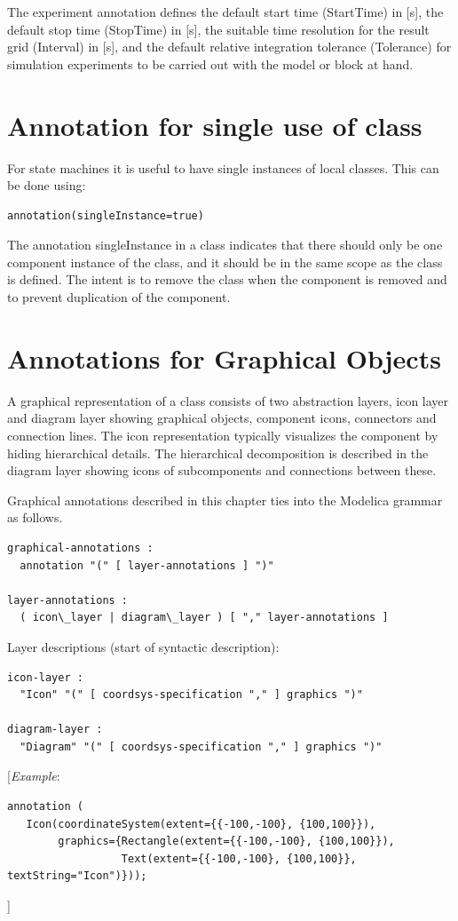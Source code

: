 \documentclass[10pt,a4paper]{report}
\def\doublelabel#1{\label{#1}}
\begin{document}
The experiment annotation defines the default start time (StartTime) in
  {[}s{]}, the default stop time (StopTime) in {[}s{]}, the suitable time
  resolution for the result grid (Interval) in {[}s{]}, and the default
relative integration tolerance (Tolerance) for simulation experiments to
be carried out with the model or block at hand.

\section{Annotation for single use of class}\doublelabel{annotation-for-single-use-of-class}

For state machines it is useful to have single instances of local
classes. This can be done using:
\begin{lstlisting}[language=modelica]
annotation(singleInstance=true)
\end{lstlisting}

The annotation singleInstance in a class indicates that there should
only be one component instance of the class, and it should be in the
same scope as the class is defined. The intent is to remove the class
when the component is removed and to prevent duplication of the
component.

\section{Annotations for Graphical Objects}\doublelabel{annotations-for-graphical-objects}

A graphical representation of a class consists of two abstraction
layers, icon layer and diagram layer showing graphical objects,
component icons, connectors and connection lines. The icon
representation typically visualizes the component by hiding hierarchical
details. The hierarchical decomposition is described in the diagram
layer showing icons of subcomponents and connections between these.

Graphical annotations described in this chapter ties into the Modelica
grammar as follows.
\begin{lstlisting}[language=grammar]
graphical-annotations :
  annotation "(" [ layer-annotations ] ")"

layer-annotations :
  ( icon\_layer | diagram\_layer ) [ "," layer-annotations ]
\end{lstlisting}
Layer descriptions (start of syntactic description):
\begin{lstlisting}[language=grammar]
icon-layer :
  "Icon" "(" [ coordsys-specification "," ] graphics ")"

diagram-layer :
  "Diagram" "(" [ coordsys-specification "," ] graphics ")"
\end{lstlisting}
{[}\emph{Example}:
\begin{lstlisting}[language=modelica]
annotation (
   Icon(coordinateSystem(extent={{-100,-100}, {100,100}}),
        graphics={Rectangle(extent={{-100,-100}, {100,100}}),
                  Text(extent={{-100,-100}, {100,100}}, textString="Icon")})); 
\end{lstlisting}
{]}
\end{document}
